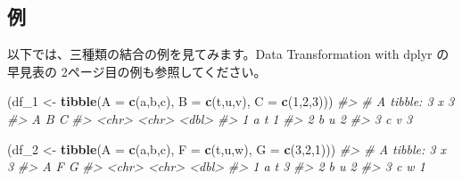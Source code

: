 \documentclass[
  xelatex, ja=standard]{bxjsbook}
\newenvironment{Shaded}{\begin{snugshade}}{\end{snugshade}}
\newcommand{\AttributeTok}[1]{\textcolor[rgb]{0.13,0.29,0.53}{#1}}
\newcommand{\CommentTok}[1]{\textcolor[rgb]{0.56,0.35,0.01}{\textit{#1}}}
\newcommand{\DecValTok}[1]{\textcolor[rgb]{0.00,0.00,0.81}{#1}}
\newcommand{\FunctionTok}[1]{\textcolor[rgb]{0.13,0.29,0.53}{\textbf{#1}}}
\newcommand{\NormalTok}[1]{#1}
\newcommand{\OtherTok}[1]{\textcolor[rgb]{0.56,0.35,0.01}{#1}}
\newcommand{\StringTok}[1]{\textcolor[rgb]{0.31,0.60,0.02}{#1}}
\theoremstyle{definition}
\theoremstyle{definition}
\theoremstyle{definition}
\theoremstyle{definition}
\theoremstyle{remark}
\begin{document}
\hypertarget{ux4f8b-1}{%
\subsection{例}\label{ux4f8b-1}}

以下では、三種類の結合の例を見てみます。Data Transformation with dplyr の早見表の 2ページ目の例も参照してください。

\begin{Shaded}
\begin{Highlighting}[]
\NormalTok{(df\_1 }\OtherTok{\textless{}{-}} \FunctionTok{tibble}\NormalTok{(}\AttributeTok{A =} \FunctionTok{c}\NormalTok{(}\StringTok{\textquotesingle{}a\textquotesingle{}}\NormalTok{,}\StringTok{\textquotesingle{}b\textquotesingle{}}\NormalTok{,}\StringTok{\textquotesingle{}c\textquotesingle{}}\NormalTok{), }\AttributeTok{B =} \FunctionTok{c}\NormalTok{(}\StringTok{\textquotesingle{}t\textquotesingle{}}\NormalTok{,}\StringTok{\textquotesingle{}u\textquotesingle{}}\NormalTok{,}\StringTok{\textquotesingle{}v\textquotesingle{}}\NormalTok{), }\AttributeTok{C =} \FunctionTok{c}\NormalTok{(}\DecValTok{1}\NormalTok{,}\DecValTok{2}\NormalTok{,}\DecValTok{3}\NormalTok{)))}
\CommentTok{\#\textgreater{} \# A tibble: 3 x 3}
\CommentTok{\#\textgreater{}   A     B         C}
\CommentTok{\#\textgreater{}   \textless{}chr\textgreater{} \textless{}chr\textgreater{} \textless{}dbl\textgreater{}}
\CommentTok{\#\textgreater{} 1 a     t         1}
\CommentTok{\#\textgreater{} 2 b     u         2}
\CommentTok{\#\textgreater{} 3 c     v         3}
\end{Highlighting}
\end{Shaded}

\begin{Shaded}
\begin{Highlighting}[]
\NormalTok{(df\_2 }\OtherTok{\textless{}{-}} \FunctionTok{tibble}\NormalTok{(}\AttributeTok{A =} \FunctionTok{c}\NormalTok{(}\StringTok{\textquotesingle{}a\textquotesingle{}}\NormalTok{,}\StringTok{\textquotesingle{}b\textquotesingle{}}\NormalTok{,}\StringTok{\textquotesingle{}c\textquotesingle{}}\NormalTok{), }\AttributeTok{F =} \FunctionTok{c}\NormalTok{(}\StringTok{\textquotesingle{}t\textquotesingle{}}\NormalTok{,}\StringTok{\textquotesingle{}u\textquotesingle{}}\NormalTok{,}\StringTok{\textquotesingle{}w\textquotesingle{}}\NormalTok{), }\AttributeTok{G =} \FunctionTok{c}\NormalTok{(}\DecValTok{3}\NormalTok{,}\DecValTok{2}\NormalTok{,}\DecValTok{1}\NormalTok{)))}
\CommentTok{\#\textgreater{} \# A tibble: 3 x 3}
\CommentTok{\#\textgreater{}   A     F         G}
\CommentTok{\#\textgreater{}   \textless{}chr\textgreater{} \textless{}chr\textgreater{} \textless{}dbl\textgreater{}}
\CommentTok{\#\textgreater{} 1 a     t         3}
\CommentTok{\#\textgreater{} 2 b     u         2}
\CommentTok{\#\textgreater{} 3 c     w         1}
\end{Highlighting}
\end{Shaded}
\end{document}
